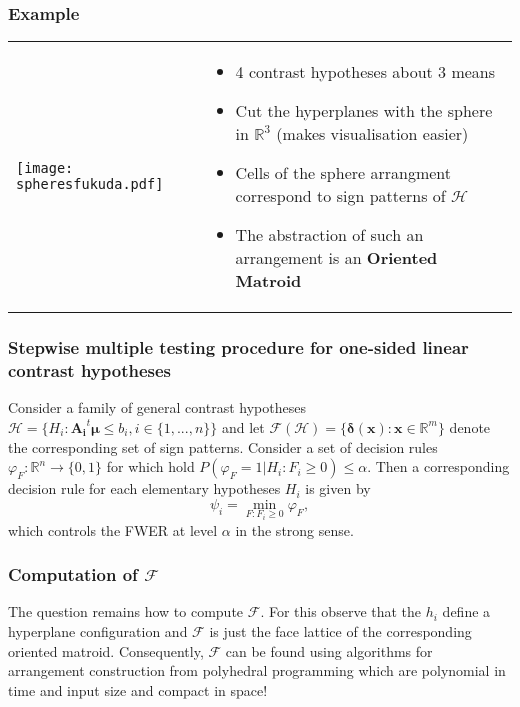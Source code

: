 \documentclass[bigger]{beamer}
\newcommand{\bs}[1]{\bm{#1}}
\newcommand{\R}{\mathbb{R}}
\providecommand{\alert}[1]{\textbf{#1}}
\begin{document}
\begin{frame}
 \frametitle{Example}

\begin{tabular}{ll}
 \begin{minipage}{.4\textwidth}
 \texttt{[image: spheresfukuda.pdf]}
 \end{minipage} &
 \begin{minipage}{.6\textwidth}
   \begin{itemize}
   \item 4 contrast hypotheses about 3 means
   \item Cut the hyperplanes with the sphere in $\R^3$ (makes
     visualisation easier)
   \item Cells of the sphere arrangment correspond to sign patterns
     of $\mathscr{H}$
   \item The abstraction of such an arrangement is an \alert{Oriented Matroid}
   \end{itemize}
 \end{minipage}
\end{tabular}

\end{frame}

\begin{frame}
 \frametitle{Stepwise multiple testing procedure for one-sided linear
   contrast hypotheses}

 Consider a family of general contrast hypotheses $\mathscr{H} =
 \{H_i: \bs{A_i}^t\bs{\mu} \leq b_i,i \in \{1,...,n\}\}$ and let
 $\mathscr{F}(\mathscr{H}) = \{ \bs{\delta}(\bs{x}): \bs{x} \in
 \R^m\}$ denote the corresponding set of sign patterns. Consider a
 set of decision rules $\varphi_F: \R^n \rightarrow \{0,1\}$ for
 which hold $P(\varphi_F = 1 | H_i: F_i \geq 0) \leq \alpha$. Then a
 corresponding decision rule for each elementary hypotheses $H_i$ is
 given by
 \begin{equation}
   \label{eq:signtest}
   \psi_i = \min_{F: F_i \geq 0} \varphi_F,
 \end{equation}
 which controls the FWER at level $\alpha$ in the strong sense.


\end{frame}


\begin{frame}
 \frametitle{Computation of $\mathscr{F}$}
 The question remains how to compute $\mathcal{F}$. For this observe
that the $h_i$ define a hyperplane configuration and $\mathcal{F}$ is
just the face lattice of the corresponding oriented
matroid. Consequently, $\mathcal{F}$ can be found using algorithms
for arrangement construction from polyhedral programming
\cite{avis1992pivoting,avis1996reverse,ferrez2001cuts} which are
polynomial in time and input size and compact in space!

\end{frame}
\end{document}
